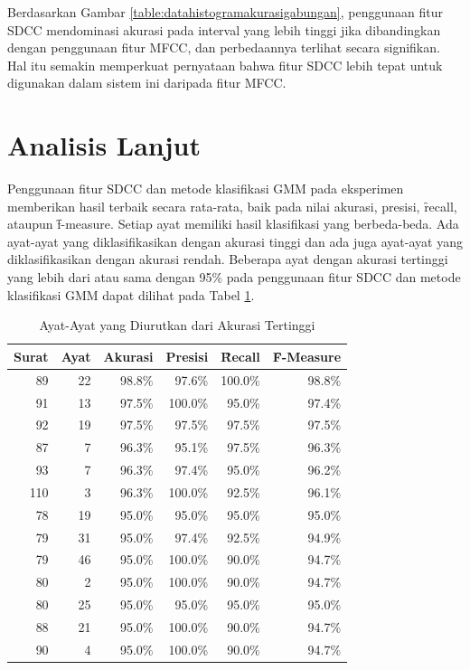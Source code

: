   Berdasarkan Gambar \ref{table:datahistogramakurasigabungan}, penggunaan fitur SDCC mendominasi akurasi pada interval yang lebih tinggi jika dibandingkan dengan penggunaan fitur MFCC, dan perbedaannya terlihat secara signifikan. Hal itu semakin memperkuat pernyataan bahwa fitur SDCC lebih tepat untuk digunakan dalam sistem ini daripada fitur MFCC.














\section{Analisis Lanjut}

Penggunaan fitur SDCC dan metode klasifikasi GMM pada eksperimen memberikan hasil terbaik secara rata-rata, baik pada nilai akurasi, presisi, \f{recall}, ataupun \f{f-measure}. Setiap ayat memiliki hasil klasifikasi yang berbeda-beda. Ada ayat-ayat yang diklasifikasikan dengan akurasi tinggi dan ada juga ayat-ayat yang diklasifikasikan dengan akurasi rendah. Beberapa ayat dengan akurasi tertinggi yang lebih dari atau sama dengan 95\% pada penggunaan fitur SDCC dan metode klasifikasi GMM dapat dilihat pada Tabel \ref{table:akurasitinggi}.

\begin{table}
  \centering
  \caption{Ayat-Ayat yang Diurutkan dari Akurasi Tertinggi}
  \label{table:akurasitinggi}
  \begin{tabular}{|r|r|r|r|r|r|}
  \hline
  Surat & Ayat & Akurasi & Presisi & \f{Recall}  & \f{F-Measure} \\ \hline
  89  & 22 & 98.8\% & 97.6\%  & 100.0\% & 98.8\% \\ \hline
  91  & 13 & 97.5\% & 100.0\% & 95.0\%  & 97.4\% \\ \hline
  92  & 19 & 97.5\% & 97.5\%  & 97.5\%  & 97.5\% \\ \hline
  87  & 7  & 96.3\% & 95.1\%  & 97.5\%  & 96.3\% \\ \hline
  93  & 7  & 96.3\% & 97.4\%  & 95.0\%  & 96.2\% \\ \hline
  110 & 3  & 96.3\% & 100.0\% & 92.5\%  & 96.1\% \\ \hline
  78  & 19 & 95.0\% & 95.0\%  & 95.0\%  & 95.0\% \\ \hline
  79  & 31 & 95.0\% & 97.4\%  & 92.5\%  & 94.9\% \\ \hline
  79  & 46 & 95.0\% & 100.0\% & 90.0\%  & 94.7\% \\ \hline
  80  & 2  & 95.0\% & 100.0\% & 90.0\%  & 94.7\% \\ \hline
  80  & 25 & 95.0\% & 95.0\%  & 95.0\%  & 95.0\% \\ \hline
  88  & 21 & 95.0\% & 100.0\% & 90.0\%  & 94.7\% \\ \hline
  90  & 4  & 95.0\% & 100.0\% & 90.0\%  & 94.7\% \\ \hline
  \end{tabular}
\end{table}



